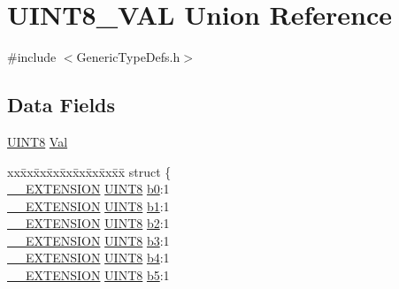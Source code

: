 \hypertarget{union_u_i_n_t8___v_a_l}{}\section{U\+I\+N\+T8\+\_\+\+V\+A\+L Union Reference}
\label{union_u_i_n_t8___v_a_l}


{\ttfamily \#include $<$Generic\+Type\+Defs.\+h$>$}

\subsection*{Data Fields}
\begin{DoxyCompactItemize}
\item 
\hyperlink{_generic_type_defs_8h_ab27e9918b538ce9d8ca692479b375b6a}{U\+I\+N\+T8} \hyperlink{union_u_i_n_t8___v_a_l_a8771f77e61c81831be1a68e6dc5684bb}{Val}
\item 
\begin{tabbing}
xx\=xx\=xx\=xx\=xx\=xx\=xx\=xx\=xx\=\kill
struct \{\\
\>\hyperlink{_generic_type_defs_8h_a6f634b0fdcc4febac630fc28e2685ddb}{\_\_EXTENSION} \hyperlink{_generic_type_defs_8h_ab27e9918b538ce9d8ca692479b375b6a}{UINT8} \hyperlink{union_u_i_n_t8___v_a_l_a4074b3ee420d7782dce819fb031c29a2}{b0}:1\\
\>\hyperlink{_generic_type_defs_8h_a6f634b0fdcc4febac630fc28e2685ddb}{\_\_EXTENSION} \hyperlink{_generic_type_defs_8h_ab27e9918b538ce9d8ca692479b375b6a}{UINT8} \hyperlink{union_u_i_n_t8___v_a_l_abd793f2202642a6be403e0532d5ad5ac}{b1}:1\\
\>\hyperlink{_generic_type_defs_8h_a6f634b0fdcc4febac630fc28e2685ddb}{\_\_EXTENSION} \hyperlink{_generic_type_defs_8h_ab27e9918b538ce9d8ca692479b375b6a}{UINT8} \hyperlink{union_u_i_n_t8___v_a_l_a2ad49445b4bb437bcd0e0c20c5d21050}{b2}:1\\
\>\hyperlink{_generic_type_defs_8h_a6f634b0fdcc4febac630fc28e2685ddb}{\_\_EXTENSION} \hyperlink{_generic_type_defs_8h_ab27e9918b538ce9d8ca692479b375b6a}{UINT8} \hyperlink{union_u_i_n_t8___v_a_l_a8392e255640c8dfc55767a2a8e9fa1a0}{b3}:1\\
\>\hyperlink{_generic_type_defs_8h_a6f634b0fdcc4febac630fc28e2685ddb}{\_\_EXTENSION} \hyperlink{_generic_type_defs_8h_ab27e9918b538ce9d8ca692479b375b6a}{UINT8} \hyperlink{union_u_i_n_t8___v_a_l_a9df872f78e71aa916d06d8a382ed8524}{b4}:1\\
\>\hyperlink{_generic_type_defs_8h_a6f634b0fdcc4febac630fc28e2685ddb}{\_\_EXTENSION} \hyperlink{_generic_type_defs_8h_ab27e9918b538ce9d8ca692479b375b6a}{UINT8} \hyperlink{union_u_i_n_t8___v_a_l_aa4751b288a52c78236f43095fb0f8235}{b5}:1\\

\end{tabbing}
\end{DoxyCompactItemize}

